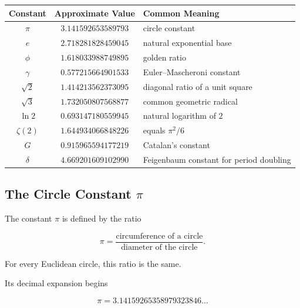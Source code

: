 \begin{center}
\begin{tabular}{c|c|l}
\textbf{Constant}
&
\textbf{Approximate Value}
&
\textbf{Common Meaning}
\\ \hline

\(\pi\)
&
\(3.141592653589793\)
&
circle constant
\\

\(e\)
&
\(2.718281828459045\)
&
natural exponential base
\\

\(\phi\)
&
\(1.618033988749895\)
&
golden ratio
\\

\(\gamma\)
&
\(0.577215664901533\)
&
Euler--Mascheroni constant
\\

\(\sqrt{2}\)
&
\(1.414213562373095\)
&
diagonal ratio of a unit square
\\

\(\sqrt{3}\)
&
\(1.732050807568877\)
&
common geometric radical
\\

\(\ln 2\)
&
\(0.693147180559945\)
&
natural logarithm of \(2\)
\\

\(\zeta(2)\)
&
\(1.644934066848226\)
&
equals \(\pi^2/6\)
\\

\(G\)
&
\(0.915965594177219\)
&
Catalan's constant
\\

\(\delta\)
&
\(4.669201609102990\)
&
Feigenbaum constant for period doubling
\end{tabular}
\end{center}

\subsection{The Circle Constant \(\pi\)}
\label{subsec:pi-constant-reference}

The constant \(\pi\) is defined by the ratio

\[
\boxed{
\pi
=
\frac{
\text{circumference of a circle}
}{
\text{diameter of the circle}
}.
}
\]

For every Euclidean circle, this ratio is the same.

Its decimal expansion begins

\[
\boxed{
\pi
=
3.14159265358979323846\ldots
}
\]

